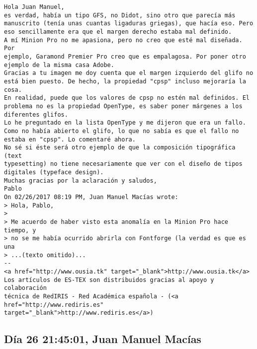 \documentclass[a4paper,10pt]{article}
\begin{document}
\begin{lstlisting}
Hola Juan Manuel,
es verdad, había un tipo GFS, no Didot, sino otro que parecía más
manuscrito (tenía unas cuantas ligaduras griegas), que hacía eso. Pero
eso sencillamente era que el margen derecho estaba mal definido.
A mí Minion Pro no me apasiona, pero no creo que esté mal diseñada. Por
ejemplo, Garamond Premier Pro creo que es empalagosa. Por poner otro
ejemplo de la misma casa Adobe.
Gracias a tu imagen me doy cuenta que el margen izquierdo del glifo no
está bien puesto. De hecho, la propiedad "cpsp" incluso mejoraría la cosa.
En realidad, puede que los valores de cpsp no estén mal definidos. El
problema no es la propiedad OpenType, es saber poner márgenes a los
diferentes glifos.
Lo he preguntado en la lista OpenType y me dijeron que era un fallo.
Como no había abierto el glifo, lo que no sabía es que el fallo no
estaba en "cpsp". Lo comentaré ahora.
No sé si éste será otro ejemplo de que la composición tipográfica (text
typesetting) no tiene necesariamente que ver con el diseño de tipos
digitales (typeface design).
Muchas gracias por la aclaración y saludos,
Pablo
On 02/26/2017 08:19 PM, Juan Manuel Macías wrote:
> Hola, Pablo,
> 
> Me acuerdo de haber visto esta anomalía en la Minion Pro hace tiempo, y
> no se me había ocurrido abrirla con Fontforge (la verdad es que es una
> ...(texto omitido)...
-- 
<a href="http://www.ousia.tk" target="_blank">http://www.ousia.tk</a>
Los artículos de ES-TEX son distribuidos gracias al apoyo y colaboración 
técnica de RedIRIS - Red Académica española - (<a href="http://www.rediris.es" target="_blank">http://www.rediris.es</a>)

\end{lstlisting}

\subsection{Día 26 21:45:01, Juan Manuel Macías}
\end{document}
